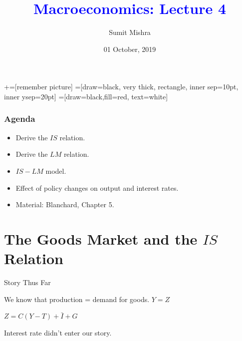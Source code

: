\documentclass[shownotes,11pt, aspectratio=169]{beamer}
\title[]{\textcolor{blue}{Macroeconomics: Lecture 4}}
\author[SM]{Sumit Mishra}
\institute[IFMR]{\small{\begin{tabular}{c}
IFMR, Sri City \\
\end{tabular}}}
\date{01 October, 2019}
\newenvironment{wideitemize}{\itemize\addtolength{\itemsep}{10pt}}{\enditemize}
\begin{document}
\newcommand\marktopleft[1]{%
    \tikz[overlay,remember picture] 
        \node (marker-#1-a) at (-.3em,.3em) {};%
}
\newcommand\markbottomright[2]{%
    \tikz[overlay,remember picture] 
        \node (marker-#1-b) at (0em,0em) {};%
}
+=[remember picture] 
 =[draw=black, very thick, rectangle, inner sep=10pt, inner ysep=20pt]
 =[draw=black,fill=red, text=white]

\begin{frame}
\maketitle
\end{frame}

\begin{frame}
\frametitle{Agenda}
\begin{itemize}
\item Derive the $IS$ relation.
\item Derive the $LM$ relation.
\item $IS-LM$ model.
\item Effect of policy changes on output and interest rates.
\item Material: Blanchard, Chapter 5.
\end{itemize}
\end{frame}

\section{The Goods Market and the $IS$ Relation}
\begin{frame}{Story Thus Far}
\begin{wideitemize}
\item We know that production = demand for goods. $Y = Z$
\item $Z = C(Y - T) + \bar{I} + G$
\item Interest rate didn't enter our story.
\end{wideitemize}
\end{frame}
\end{document}

